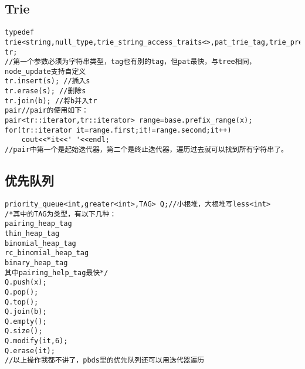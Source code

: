 \documentclass[twocolumn,a4]{article}
\begin{document}
\subsection{Trie}
\begin{lstlisting}
typedef trie<string,null_type,trie_string_access_traits<>,pat_trie_tag,trie_prefix_search_node_update> tr;
//第一个参数必须为字符串类型，tag也有别的tag，但pat最快，与tree相同，node_update支持自定义
tr.insert(s); //插入s
tr.erase(s); //删除s
tr.join(b); //将b并入tr
pair//pair的使用如下：
pair<tr::iterator,tr::iterator> range=base.prefix_range(x);
for(tr::iterator it=range.first;it!=range.second;it++)
    cout<<*it<<' '<<endl;
//pair中第一个是起始迭代器，第二个是终止迭代器，遍历过去就可以找到所有字符串了。
\end{lstlisting}

\subsection{优先队列}
\begin{lstlisting}
priority_queue<int,greater<int>,TAG> Q;//小根堆，大根堆写less<int>
/*其中的TAG为类型，有以下几种：
pairing_heap_tag
thin_heap_tag
binomial_heap_tag
rc_binomial_heap_tag
binary_heap_tag
其中pairing_help_tag最快*/
Q.push(x);
Q.pop();
Q.top();
Q.join(b);
Q.empty();
Q.size();
Q.modify(it,6);
Q.erase(it);
//以上操作我都不讲了，pbds里的优先队列还可以用迭代器遍历
\end{lstlisting}
\end{document}

